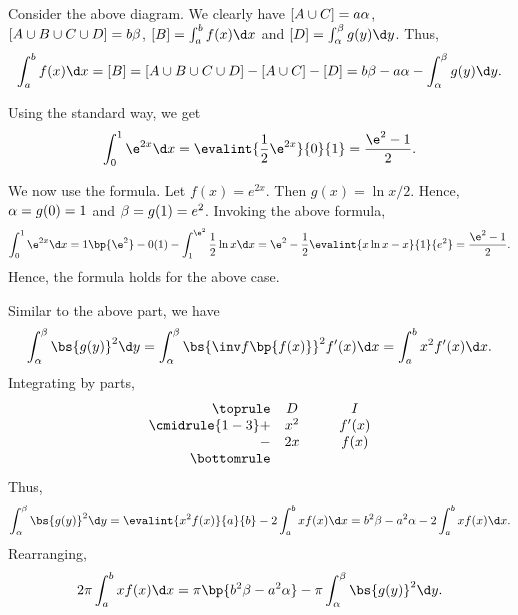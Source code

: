 \begin{solution}
\begin{center}
    \end{center}

    Consider the above diagram. We clearly have $[A \cup C] = a \alpha$, $[A \cup B \cup C \cup D] = b\beta$, $[B] = \int_a^b f(x) \d x$ and $[D] = \int_\a^\b g(y) \d y$. Thus, \[\int_a^b f(x) \d x = [B] = [A \cup B \cup C \cup D] - [A \cup C] - [D] = b\b - a\a - \int_\a^\b g(y) \d y.\]

    Using the standard way, we get \[\int_0^1 \e^{2x} \d x = \evalint{\frac12 \e^{2x}}{0}{1} = \frac{\e^2 - 1}2.\]

    We now use the formula. Let $f(x) = e^{2x}$. Then $g(x) = \ln{x}/2$. Hence, $\alpha = g(0) = 1$ and $\beta = g(1) = e^2$. Invoking the above formula, \[\int_0^1 \e^{2x} \d x = 1\bp{\e^2} - 0(1) - \int_1^{\e^2} \frac12 \ln x \d x = \e^2 - \frac12 \evalint{x \ln x - x}{1}{e^2} = \frac{\e^2 - 1}{2}.\] Hence, the formula holds for the above case.
    
    Similar to the above part, we have \[\int_\a^\b \bs{g(y)}^2 \d y = \int_\a^\b \bs{\inv f\bp{f(x)}}^2 f'(x) \d x = \int_a^b x^2 f'(x) \d x.\] Integrating by parts,
    \[\begin{array}{r c @{\hspace*{1.0cm}} c}\toprule
        & D & I \\\cmidrule{1-3}
        + & x^2 & f'(x) \\
        - & 2x & f(x) \\\bottomrule
    \end{array}\] Thus, \[\int_\a^\b \bs{g(y)}^2 \d y = \evalint{x^2f(x)}{a}{b} - 2\int_a^b xf(x) \d x = b^2\b - a^2\a - 2\int_a^b x f(x) \d x.\] Rearranging, \[2\pi\int_a^b x f(x) \d x = \pi\bp{b^2\b - a^2\a} - \pi \int_\a^\b \bs{g(y)}^2 \d y.\]
    

\end{solution}
